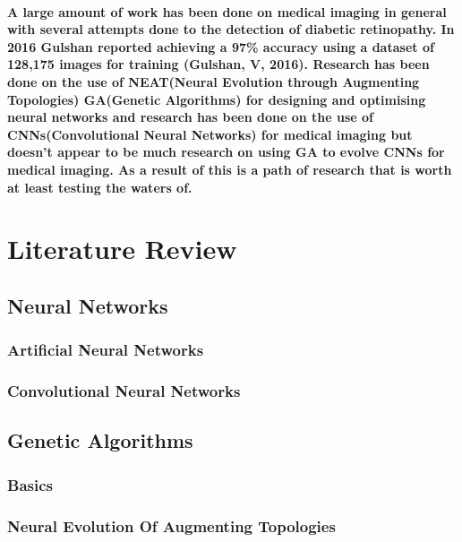 \documentclass[a4paper,12pt]{article}
\begin{document}
\paragraph{A large amount of work has been done on medical imaging in general with several attempts done to the detection of diabetic retinopathy. In 2016 Gulshan reported achieving a 97\% accuracy using  a dataset of 128,175 images for training (Gulshan, V, 2016). Research has been done on the use of NEAT(Neural Evolution through Augmenting Topologies) GA(Genetic Algorithms) for designing and optimising neural networks and research has been done on the use of CNNs(Convolutional Neural Networks) for medical imaging but doesn’t appear to be much research on using GA to evolve CNNs for medical imaging. As a result of this is a path of research that is worth at least testing the waters of.}
\newpage
\section{Literature Review}
\subsection{Neural Networks}
\subsubsection{Artificial Neural Networks}
\paragraph{}
\subsubsection{Convolutional Neural Networks}
\paragraph{}
\subsection{Genetic Algorithms}
\subsubsection{Basics}
\paragraph{}
\subsubsection{Neural Evolution Of Augmenting Topologies}
\end{document}
